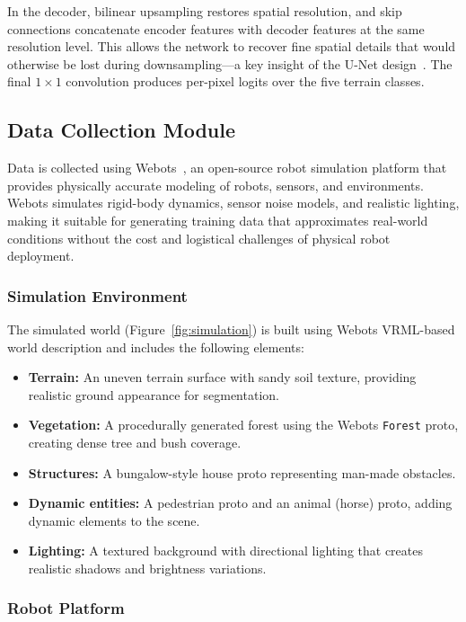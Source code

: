 \documentclass[12pt,a4paper]{article}
\begin{document}
In the decoder, bilinear upsampling restores spatial resolution, and skip connections concatenate encoder features with decoder features at the same resolution level. This allows the network to recover fine spatial details that would otherwise be lost during downsampling---a key insight of the U-Net design~\cite{ronneberger2015}. The final $1 \times 1$ convolution produces per-pixel logits over the five terrain classes.

\subsection{Data Collection Module}

Data is collected using Webots~\cite{webots}, an open-source robot simulation platform that provides physically accurate modeling of robots, sensors, and environments. Webots simulates rigid-body dynamics, sensor noise models, and realistic lighting, making it suitable for generating training data that approximates real-world conditions without the cost and logistical challenges of physical robot deployment.

\subsubsection{Simulation Environment}

The simulated world (Figure~\ref{fig:simulation}) is built using Webots VRML-based world description and includes the following elements:

\begin{itemize}[noitemsep]
    \item \textbf{Terrain:} An uneven terrain surface with sandy soil texture, providing realistic ground appearance for segmentation.
    \item \textbf{Vegetation:} A procedurally generated forest using the Webots \texttt{Forest} proto, creating dense tree and bush coverage.
    \item \textbf{Structures:} A bungalow-style house proto representing man-made obstacles.
    \item \textbf{Dynamic entities:} A pedestrian proto and an animal (horse) proto, adding dynamic elements to the scene.
    \item \textbf{Lighting:} A textured background with directional lighting that creates realistic shadows and brightness variations.
\end{itemize}

\subsubsection{Robot Platform}
\end{document}
